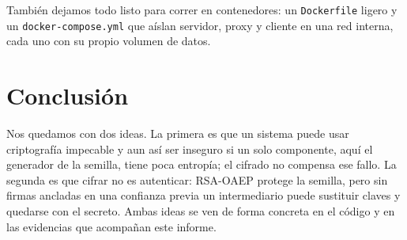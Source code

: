 \documentclass[11pt,a4paper]{article}
\begin{document}
También dejamos todo listo para correr en contenedores: un \texttt{Dockerfile}
ligero y un \texttt{docker-compose.yml} que aíslan servidor, proxy y cliente en
una red interna, cada uno con su propio volumen de datos.

\section{Conclusión}

Nos quedamos con dos ideas. La primera es que un sistema puede usar criptografía
impecable y aun así ser inseguro si un solo componente, aquí el generador de la
semilla, tiene poca entropía; el cifrado no compensa ese fallo. La segunda es que
cifrar no es autenticar: RSA-OAEP protege la semilla, pero sin firmas ancladas en
una confianza previa un intermediario puede sustituir claves y quedarse con el
secreto. Ambas ideas se ven de forma concreta en el código y en las evidencias que
acompañan este informe.
\end{document}
